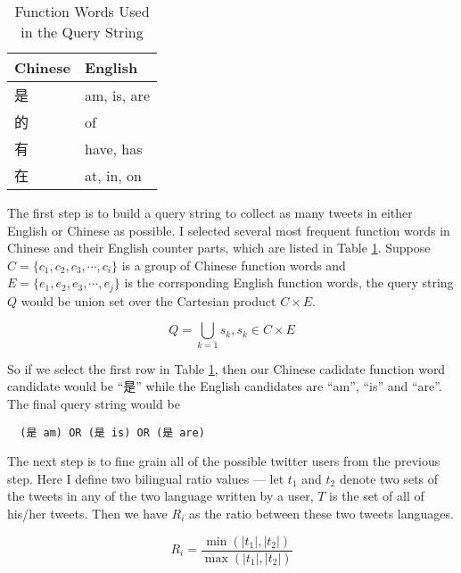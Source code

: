 \documentclass[11pt,a4paper]{article}
\begin{document}
\begin{CJK*}{UTF8}{gbsn}

\begin{table}[t]
  \begin{center}
  \begin{tabular}{|l|l|}
  \hline \bf Chinese & \bf English \\ \hline
  是 & am, is, are \\
  的 & of \\
  有 & have, has \\
  在 & at, in, on \\
  \hline
  \end{tabular}
  \end{center}
  \caption{\label{tab:query-func-words-table} Function Words Used in the Query String}
\end{table}

The first step is to build a query string to collect as many tweets in either English or Chinese as possible. I selected several most frequent function words in Chinese and their English counter parts, which are listed in Table \ref{tab:query-func-words-table}. Suppose $C=\{c_1, c_2, c_3, \cdots, c_i\}$ is a group of Chinese function words and $E=\{e_1, e_2, e_3, \cdots, e_j\}$ is the corrsponding English function words, the query string $Q$ would be union set over the Cartesian product $C\times E$.

\begin{equation}
  Q=\bigcup_{k=1}s_k, s_k \in C \times E
\end{equation}

So if we select the first row in Table \ref{tab:query-func-words-table}, then our Chinese cadidate function word candidate would be ``是'' while the English candidates are ``am'', ``is'' and ``are''. The final query string would be \begin{verbatim}
  (是 am) OR (是 is) OR (是 are)
\end{verbatim}
\end{CJK*}

The next step is to fine grain all of the possible twitter users from the previous step. Here I define two bilingual ratio values --- let $t_1$ and $t_2$ denote two sets of the tweets in any of the two language written by a user, $T$ is the set of all of his/her tweets. Then we have $R_i$ as the ratio between these two tweets languages.

\begin{equation}
  R_i = \frac{\min(|t_1|, |t_2|)}{\max(|t_1|, |t_2|)}
\end{equation}
\end{document}
